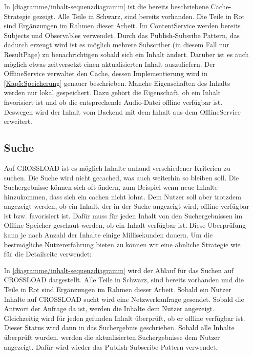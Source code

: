 
In \autoref{diagramme/inhalt-sequenzdiagramm} ist die bereits beschriebene Cache-Strategie gezeigt. Alle Teile in Schwarz, sind bereits vorhanden. Die Teile in Rot sind Ergänzungen im Rahmen dieser Arbeit. Im ContentService werden bereits Subjects und Observables verwendet. Durch das Publish-Subsribe Pattern, das dadurch erzeugt wird ist es möglich mehrere Subscriber (in diesem Fall nur ResultPage) zu benachrichtigen sobald sich ein Inhalt ändert. Darüber ist es auch möglich etwas zeitversetzt einen aktualisierten Inhalt auszuliefern. Der OfflineService verwaltet den Cache, dessen Implementierung wird in \autoref{Kap5:Speicherung} genauer beschrieben. Manche Eigenschaften des Inhalts werden nur lokal gespeichert. Dazu gehört die Eigenschaft, ob ein Inhalt favorisiert ist und ob die entsprechende Audio-Datei offline verfügbar ist. Deswegen wird der Inhalt vom Backend mit dem Inhalt aus dem OfflineService erweitert.

\subsection{Suche}
Auf CROSSLOAD ist es möglich Inhalte anhand verschiedener Kriterien zu suchen. Die Suche wird nicht gecached, was auch weiterhin so bleiben soll. Die Suchergebnisse können sich oft ändern, zum Beispiel wenn neue Inhalte hinzukommen, dass sich ein cachen nicht lohnt. Dem Nutzer soll aber trotzdem angezeigt werden, ob ein Inhalt, der in der Suche angezeigt wird, offline verfügbar ist bzw. favorisiert ist. Dafür muss für jeden Inhalt von den Suchergebnissen im Offline Speicher geschaut werden, ob ein Inhalt verfügbar ist. Diese Überprüfung kann je nach Anzahl der Inhalte einige Millisekunden dauern. Um die bestmögliche Nutzererfahrung bieten zu können wir eine ähnliche Strategie wie für die Detailseite verwendet:


In \autoref{diagramme/inhalt-sequenzdiagramm} wird der Ablauf für das Suchen auf CROSSLOAD dargestellt. Alle Teile in Schwarz, sind bereits vorhanden und die Teile in Rot sind Ergänzungen im Rahmen dieser Arbeit. Sobald ein Nutzer Inhalte auf CROSSLOAD sucht wird eine Netzwerkanfrage gesendet. Sobald die Antwort der Anfrage da ist, werden die Inhalte dem Nutzer angezeigt. Gleichzeitig wird für jeden gefunden Inhalt überprüft, ob er offline verfügbar ist. Dieser Status wird dann in das Suchergebnis geschrieben. Sobald alle Inhalte überprüft wurden, werden die aktualisierten Suchergebnisse dem Nutzer angezeigt. Dafür wird wieder das Publish-Subscribe Pattern verwendet. 

